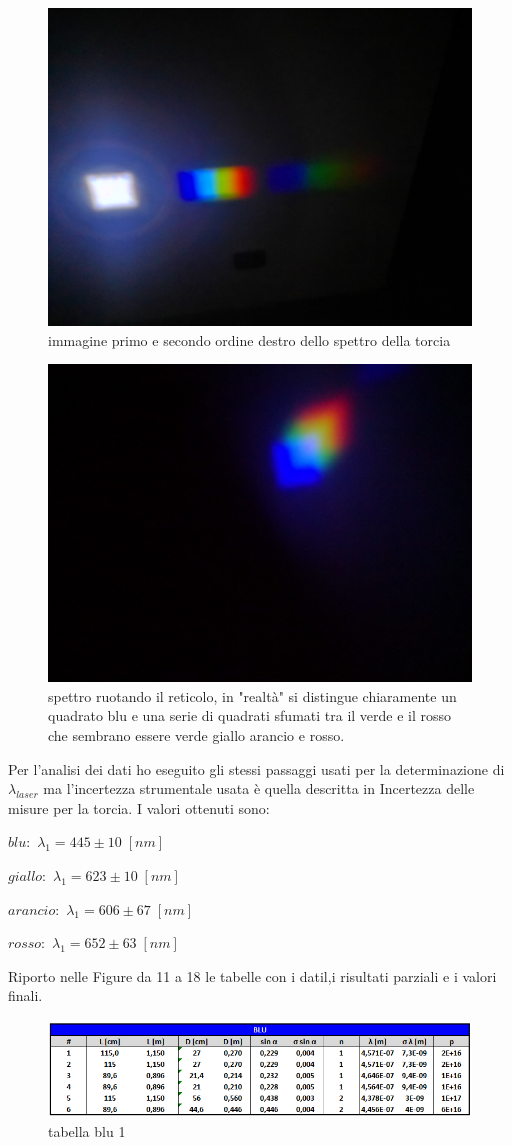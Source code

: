 \documentclass{article}
\begin{document}
\begin{figure}[h!]
  \centering
  \includegraphics[width=0.4\linewidth]{IM torcia}
  \caption{immagine primo e secondo ordine destro dello spettro della torcia}
\end{figure}

\begin{figure}[h!]
  \centering
  \includegraphics[width=0.4\linewidth]{IM torcia storta}
  \caption{spettro ruotando il reticolo, in "realtà" si distingue chiaramente un quadrato blu e una serie di quadrati sfumati tra il verde e il rosso che sembrano essere verde giallo arancio e rosso.}
\end{figure}

Per l'analisi dei dati ho eseguito gli stessi passaggi usati per la determinazione di $\lambda_{laser}$ ma l'incertezza strumentale usata è quella descritta in Incertezza delle misure per la torcia.
I valori ottenuti sono:

\begin{centering}
$blu:$ \;\;\;\;\;\; $\lambda_1 = 445 \pm 10\; [nm]$

$giallo:$ \;\; $\lambda_1 = 623 \pm 10\; [nm]$ 

$arancio:$ $\lambda_1 = 606 \pm 67\; [nm]$ 

 $rosso:$ \;\;\; $\lambda_1 = 652 \pm 63\; [nm]$ 

\end{centering}

Riporto nelle Figure da 11 a 18 le tabelle con i datil,i risultati parziali e i valori finali.

\begin{figure}[h!]
  \centering
  \includegraphics[width=1\linewidth]{IM tabella blu 1}
  \caption{tabella blu 1}
\end{figure}
\end{document}

